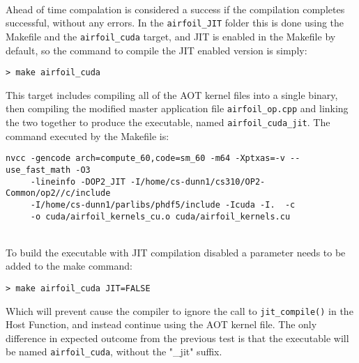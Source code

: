\\
Ahead of time compalation is considered a success if the compilation completes successful, without any errors. In the \verb|airfoil_JIT| folder this is done using the Makefile and the \verb|airfoil_cuda| target, and JIT is enabled in the Makefile by default, so the command to compile the JIT enabled version is simply:
\begin{verbatim}
> make airfoil_cuda
\end{verbatim}
This target includes compiling all of the AOT kernel files into a single binary, then compiling the modified master application file \verb|airfoil_op.cpp| and linking the two together to produce the executable, named \verb|airfoil_cuda_jit|.
The command executed by the Makefile is:
\begin{verbatim}
nvcc -gencode arch=compute_60,code=sm_60 -m64 -Xptxas=-v --use_fast_math -O3
     -lineinfo -DOP2_JIT -I/home/cs-dunn1/cs310/OP2-Common/op2//c/include
     -I/home/cs-dunn1/parlibs/phdf5/include -Icuda -I.	-c
     -o cuda/airfoil_kernels_cu.o cuda/airfoil_kernels.cu
\end{verbatim}

\\
To build the executable with JIT compilation disabled a parameter needs to be added to the make command:
\begin{verbatim}
> make airfoil_cuda JIT=FALSE
\end{verbatim}
Which will prevent cause the compiler to ignore the call to \verb|jit_compile()| in the Host Function, and instead continue using the AOT kernel file. The only difference in expected outcome from the previous test is that the executable will be named \verb|airfoil_cuda|, without the "\_jit" suffix.


